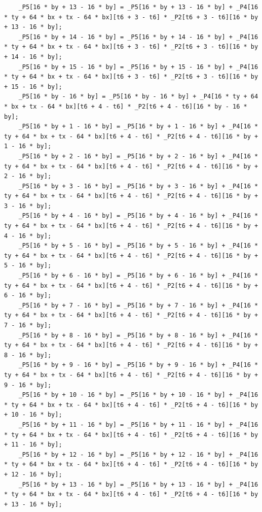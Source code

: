 \documentclass[msthesis,justified,copyright,final,numbers,sort&compress,
gsmodern,amstex,natbib]{uothesis}
\begin{document}
\begin{lstlisting}
    _P5[16 * by + 13 - 16 * by] = _P5[16 * by + 13 - 16 * by] + _P4[16 * ty + 64 * bx + tx - 64 * bx][t6 + 3 - t6] * _P2[t6 + 3 - t6][16 * by + 13 - 16 * by];
    _P5[16 * by + 14 - 16 * by] = _P5[16 * by + 14 - 16 * by] + _P4[16 * ty + 64 * bx + tx - 64 * bx][t6 + 3 - t6] * _P2[t6 + 3 - t6][16 * by + 14 - 16 * by];
    _P5[16 * by + 15 - 16 * by] = _P5[16 * by + 15 - 16 * by] + _P4[16 * ty + 64 * bx + tx - 64 * bx][t6 + 3 - t6] * _P2[t6 + 3 - t6][16 * by + 15 - 16 * by];
    _P5[16 * by - 16 * by] = _P5[16 * by - 16 * by] + _P4[16 * ty + 64 * bx + tx - 64 * bx][t6 + 4 - t6] * _P2[t6 + 4 - t6][16 * by - 16 * by];
    _P5[16 * by + 1 - 16 * by] = _P5[16 * by + 1 - 16 * by] + _P4[16 * ty + 64 * bx + tx - 64 * bx][t6 + 4 - t6] * _P2[t6 + 4 - t6][16 * by + 1 - 16 * by];
    _P5[16 * by + 2 - 16 * by] = _P5[16 * by + 2 - 16 * by] + _P4[16 * ty + 64 * bx + tx - 64 * bx][t6 + 4 - t6] * _P2[t6 + 4 - t6][16 * by + 2 - 16 * by];
    _P5[16 * by + 3 - 16 * by] = _P5[16 * by + 3 - 16 * by] + _P4[16 * ty + 64 * bx + tx - 64 * bx][t6 + 4 - t6] * _P2[t6 + 4 - t6][16 * by + 3 - 16 * by];
    _P5[16 * by + 4 - 16 * by] = _P5[16 * by + 4 - 16 * by] + _P4[16 * ty + 64 * bx + tx - 64 * bx][t6 + 4 - t6] * _P2[t6 + 4 - t6][16 * by + 4 - 16 * by];
    _P5[16 * by + 5 - 16 * by] = _P5[16 * by + 5 - 16 * by] + _P4[16 * ty + 64 * bx + tx - 64 * bx][t6 + 4 - t6] * _P2[t6 + 4 - t6][16 * by + 5 - 16 * by];
    _P5[16 * by + 6 - 16 * by] = _P5[16 * by + 6 - 16 * by] + _P4[16 * ty + 64 * bx + tx - 64 * bx][t6 + 4 - t6] * _P2[t6 + 4 - t6][16 * by + 6 - 16 * by];
    _P5[16 * by + 7 - 16 * by] = _P5[16 * by + 7 - 16 * by] + _P4[16 * ty + 64 * bx + tx - 64 * bx][t6 + 4 - t6] * _P2[t6 + 4 - t6][16 * by + 7 - 16 * by];
    _P5[16 * by + 8 - 16 * by] = _P5[16 * by + 8 - 16 * by] + _P4[16 * ty + 64 * bx + tx - 64 * bx][t6 + 4 - t6] * _P2[t6 + 4 - t6][16 * by + 8 - 16 * by];
    _P5[16 * by + 9 - 16 * by] = _P5[16 * by + 9 - 16 * by] + _P4[16 * ty + 64 * bx + tx - 64 * bx][t6 + 4 - t6] * _P2[t6 + 4 - t6][16 * by + 9 - 16 * by];
    _P5[16 * by + 10 - 16 * by] = _P5[16 * by + 10 - 16 * by] + _P4[16 * ty + 64 * bx + tx - 64 * bx][t6 + 4 - t6] * _P2[t6 + 4 - t6][16 * by + 10 - 16 * by];
    _P5[16 * by + 11 - 16 * by] = _P5[16 * by + 11 - 16 * by] + _P4[16 * ty + 64 * bx + tx - 64 * bx][t6 + 4 - t6] * _P2[t6 + 4 - t6][16 * by + 11 - 16 * by];
    _P5[16 * by + 12 - 16 * by] = _P5[16 * by + 12 - 16 * by] + _P4[16 * ty + 64 * bx + tx - 64 * bx][t6 + 4 - t6] * _P2[t6 + 4 - t6][16 * by + 12 - 16 * by];
    _P5[16 * by + 13 - 16 * by] = _P5[16 * by + 13 - 16 * by] + _P4[16 * ty + 64 * bx + tx - 64 * bx][t6 + 4 - t6] * _P2[t6 + 4 - t6][16 * by + 13 - 16 * by];

\end{lstlisting}
\end{document}

